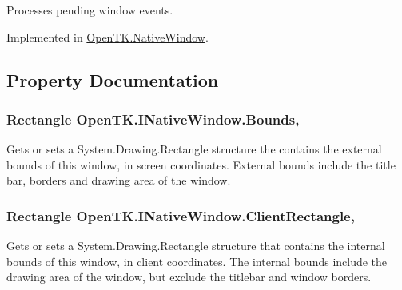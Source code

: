 Processes pending window events. 



Implemented in \hyperlink{class_open_t_k_1_1_native_window_a8150f2aa496459e492965c4577ec0dc9}{Open\-T\-K.\-Native\-Window}.



\subsection{Property Documentation}
\hypertarget{interface_open_t_k_1_1_i_native_window_a0cf4d0391cff1166a3f15fbdb1b4d8ab}{
\subsubsection[{Bounds}]{\setlength{\rightskip}{0pt plus 5cm}Rectangle Open\-T\-K.\-I\-Native\-Window.\-Bounds\hspace{0.3cm}{\ttfamily [get]}, {\ttfamily [set]}}}\label{interface_open_t_k_1_1_i_native_window_a0cf4d0391cff1166a3f15fbdb1b4d8ab}


Gets or sets a System.\-Drawing.\-Rectangle structure the contains the external bounds of this window, in screen coordinates. External bounds include the title bar, borders and drawing area of the window. 

\hypertarget{interface_open_t_k_1_1_i_native_window_a3031c1f6c7096ca84bc65d2b3baea88d}{
\subsubsection[{Client\-Rectangle}]{\setlength{\rightskip}{0pt plus 5cm}Rectangle Open\-T\-K.\-I\-Native\-Window.\-Client\-Rectangle\hspace{0.3cm}{\ttfamily [get]}, {\ttfamily [set]}}}\label{interface_open_t_k_1_1_i_native_window_a3031c1f6c7096ca84bc65d2b3baea88d}


Gets or sets a System.\-Drawing.\-Rectangle structure that contains the internal bounds of this window, in client coordinates. The internal bounds include the drawing area of the window, but exclude the titlebar and window borders. 

